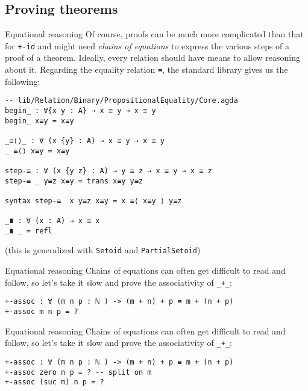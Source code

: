 \documentclass[t,aspectratio=169,9pt]{beamer}
\begin{document}
\subsection[proofs]{Proving theorems}
\begin{frame}[fragile]{Equational reasoning}
  Of course, proofs can be much more complicated than that for
  \texttt{+-id} and might need {\it chains of equations} to express
  the various steps of a proof of a theorem. Ideally, every relation should have
  means to allow reasoning about it. Regarding the equality relation
  \texttt{≡}, the standard library gives us the following:
\vfill
\begin{verbatim}
-- lib/Relation/Binary/PropositionalEquality/Core.agda
begin_ : ∀{x y : A} → x ≡ y → x ≡ y
begin_ x≡y = x≡y

_≡⟨⟩_ : ∀ (x {y} : A) → x ≡ y → x ≡ y
_ ≡⟨⟩ x≡y = x≡y

step-≡ : ∀ (x {y z} : A) → y ≡ z → x ≡ y → x ≡ z
step-≡ _ y≡z x≡y = trans x≡y y≡z

syntax step-≡  x y≡z x≡y = x ≡⟨ x≡y ⟩ y≡z

_∎ : ∀ (x : A) → x ≡ x
_∎ _ = refl
\end{verbatim}
\vfill
  (this is generalized with \texttt{Setoid} and
  \texttt{PartialSetoid})
\end{frame}

\begin{frame}[fragile]{Equational reasoning}
  Chains of equations can often get difficult to read and follow, so let's take
  it slow and prove the associativity of \texttt{_+_}:
\begin{verbatim}
+-assoc : ∀ (m n p : ℕ ) -> (m + n) + p ≡ m + (n + p)
+-assoc m n p = ?
\end{verbatim}
\end{frame}

\begin{frame}{Equational reasoning}
  Chains of equations can often get difficult to read and follow, so let's take
  it slow and prove the associativity of \texttt{_+_}:
\begin{verbatim}
+-assoc : ∀ (m n p : ℕ ) -> (m + n) + p ≡ m + (n + p)
+-assoc zero n p = ? -- split on m
+-assoc (suc m) n p = ?
\end{verbatim}
\end{frame}
\end{document}
